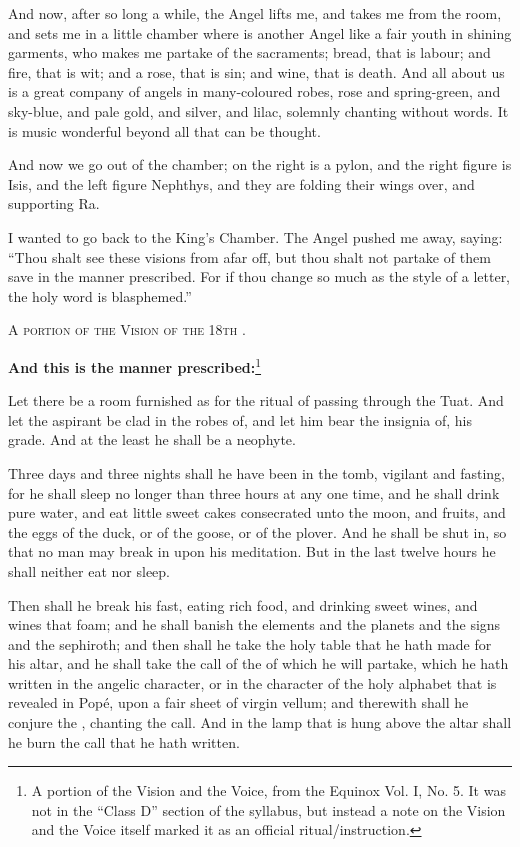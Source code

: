 \epigraph{And now, after so long a while, the Angel lifts me, and takes me from the room, and sets me in a little chamber where is another Angel like a fair youth in shining garments, who makes me partake of the sacraments; bread, that is labour; and fire, that is wit; and a rose, that is sin; and wine, that is death. And all about us is a great company of angels in many-coloured robes, rose and spring-green, and sky-blue, and pale gold, and silver, and lilac, solemnly chanting without words. It is music wonderful beyond all that can be thought.

And now we go out of the chamber; on the right is a pylon, and the right figure is Isis, and the left figure Nephthys, and they are folding their wings over, and supporting Ra.

I wanted to go back to the King's Chamber. The Angel pushed me away, saying: \enquote{Thou shalt see these visions from afar off, but thou shalt not partake of them save in the manner prescribed. For if thou change so much as the style of a letter, the holy word is blasphemed.}}{\textsc{A portion of the Vision of the 18th \AEthyr{}.}}

\textbf{And this is the manner prescribed:}\footnote{A portion of the Vision and the Voice, from the Equinox Vol. I, No. 5. It was not in the \enquote{Class D} section of the \Argentium{} syllabus, but instead a note on the Vision and the Voice itself marked it as an official ritual/instruction.}

Let there be a room furnished as for the ritual of passing through the Tuat. And let the aspirant be clad in the robes of, and let him bear the insignia of, his grade. And at the least he shall be a neophyte.

Three days and three nights shall he have been in the tomb, vigilant and fasting, for he shall sleep no longer than three hours at any one time, and he shall drink pure water, and eat little sweet cakes consecrated unto the moon, and fruits, and the eggs of the duck, or of the goose, or of the plover. And he shall be shut in, so that no man may break in upon his meditation. But in the last twelve hours he shall neither eat nor sleep.

Then shall he break his fast, eating rich food, and drinking sweet wines, and wines that foam; and he shall banish the elements and the planets and the signs and the sephiroth; and then shall he take the holy table that he hath made for his altar, and he shall take the call of the \AEthyr{} of which he will partake, which he hath written in the angelic character, or in the character of the holy alphabet that is revealed in Pop\'{e}, upon a fair sheet of virgin vellum; and therewith shall he conjure the \AEthyr{}, chanting the call. And in the lamp that is hung above the altar shall he burn the call that he hath written.

